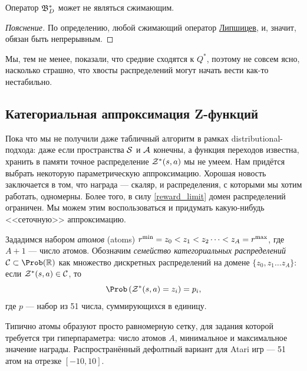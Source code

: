 \begin{proposition}
Оператор $\mathfrak{B}^*_D$ может не являться сжимающим.
\begin{proof}[Пояснение] По определению, любой сжимающий оператор \href{https://ru.wikipedia.org/wiki/\%D0\%9B\%D0\%B8\%D0\%BF\%D1\%88\%D0\%B8\%D1\%86\%D0\%B5\%D0\%B2\%D0\%BE_\%D0\%BE\%D1\%82\%D0\%BE\%D0\%B1\%D1\%80\%D0\%B0\%D0\%B6\%D0\%B5\%D0\%BD\%D0\%B8\%D0\%B5}{Липшицев}, и, значит, обязан быть непрерывным.
\end{proof}
\end{proposition}

Мы, тем не менее, показали, что средние сходятся к $Q^*$, поэтому не совсем ясно, насколько страшно, что хвосты распределений могут начать вести как-то нестабильно.

\subsection{Категориальная аппроксимация Z-функций}

Пока что мы не получили даже табличный алгоритм в рамках distributional-подхода: даже если пространства $\mathcal{S}$ и $\mathcal{A}$ конечны, а функция переходов известна, хранить в памяти точное распределение $\mathcal{Z}^*(s, a)$ мы не умеем. Нам придётся выбрать некоторую параметрическую аппроксимацию. Хорошая новость заключается в том, что награда --- скаляр, и распределения, с которыми мы хотим работать, одномерны. Более того, в силу \eqref{reward_limit} домен распределений ограничен. Мы можем этим воспользоваться и придумать какую-нибудь <<сеточную>> аппроксимацию.

\begin{definition}
Зададимся набором \emph{атомов} (atoms) $r^{\min} = z_0 \HM< z_1 \HM< z_2 \dots < z_A = r^{\max}$, где $A + 1$ --- число атомов. Обозначим \emph{семейство категориальных распределений} $\mathcal{C} \subset \Prob(\R)$ как множество дискретных распределений на домене $\{z_0, z_1 \dots z_A\}$: если $\mathcal{Z}^*(s, a) \in \mathcal{C}$, то
$$\Prob \left( \Z^*(s, a) = z_i \right) = p_i,$$
где $p$ --- набор из 51 числа, суммирующихся в единицу.
\end{definition}

\begin{example}[c51]
Типично атомы образуют просто равномерную сетку, для задания которой требуется три гиперпараметра: число атомов $A$, минимальное и максимальное значение награды. Распространённый дефолтный вариант для Atari игр --- 51 атом на отрезке $[-10, 10]$.
\end{example}

